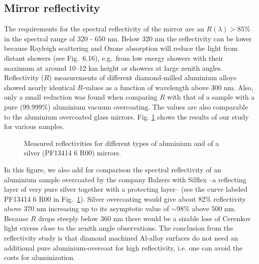 \subsection{Mirror reflectivity}


\medskip The requirements for the spectral reflectivity of the mirror are an 
$R(\lambda )>85\%$ in the spectral range of 320 - 650 nm. Below 320 nm the
reflectivity can be lower because Rayleigh scattering and Ozone absorption
will reduce the \Cerenkov light from distant showers (see 
Fig.~6.16),
e.g.\ from low energy showers with their maximum at around 10--12 km height
or showers at large zenith angles. Reflectivity ($R$) measurements of
different diamond-milled aluminium alloys showed nearly identical $R$-values
as a function of wavelength above 300 nm. Also, only a small reduction was
found when comparing $R$ with that of a sample with a pure (99.999\%) aluminium
vacuum overcoating. The values are also comparable to the aluminium overcoated
glass mirrors. Fig. \ref{fig-reflectivity} shows the results of our study
for various samples.

\begin{figure}[htb]
\begin{center}
\caption{Measured reflectivities for
different types of aluminium and of a silver (PF13414 6 R00) mirrors.}
\label{fig-reflectivity}
\end{center}
\end{figure}


In
this figure, we also add for comparison the spectral reflectivity of an aluminium
sample overcoated by the company Balzers with Silflex --a reflecting layer of
very pure silver together with a protecting layer-- (see the curve
labeled PF13414 6 R00 in Fig.~\ref{fig-reflectivity}). Silver overcoating would
give about 82\% reflectivity above 370 nm increasing up to
its asymptotic value of $\sim$98\% above 500 nm. 
Because $R$ drops steeply below
360 nm there would be a sizable loss of Cerenkov light excess close to the
zenith angle observations. The conclusion from the reflectivity study is
that diamond machined Al-alloy surfaces do not need an additional pure
aluminium-overcoat for high reflectivity, i.e. one can avoid the costs for
aluminization.

